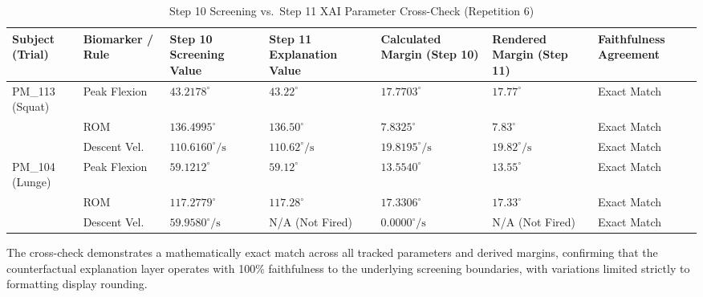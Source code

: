 \begin{table}[htbp]
\centering
\scriptsize
\setlength{\tabcolsep}{3pt}
\renewcommand{\arraystretch}{1.2}
\caption{Step 10 Screening vs.\ Step 11 XAI Parameter Cross-Check (Repetition 6)}
\label{tab:xai-parameter-cross-check}
\begin{tabular}{@{}p{2.1cm} p{2.1cm} >{\centering\arraybackslash}p{2.0cm} >{\centering\arraybackslash}p{2.0cm} >{\centering\arraybackslash}p{2.0cm} >{\centering\arraybackslash}p{2.0cm} >{\centering\arraybackslash}p{2.1cm}@{}}
\hline
\textbf{Subject (Trial)} & \textbf{Biomarker / Rule} & \textbf{Step 10 Screening Value} & \textbf{Step 11 Explanation Value} & \textbf{Calculated Margin (Step 10)} & \textbf{Rendered Margin (Step 11)} & \textbf{Faithfulness Agreement} \\
\hline
PM\_113 (Squat) & Peak Flexion & $43.2178^\circ$ & $43.22^\circ$ & $17.7703^\circ$ & $17.77^\circ$ & Exact Match \\
 & ROM & $136.4995^\circ$ & $136.50^\circ$ & $7.8325^\circ$ & $7.83^\circ$ & Exact Match \\
 & Descent Vel. & $110.6160^\circ/\text{s}$ & $110.62^\circ/\text{s}$ & $19.8195^\circ/\text{s}$ & $19.82^\circ/\text{s}$ & Exact Match \\
PM\_104 (Lunge) & Peak Flexion & $59.1212^\circ$ & $59.12^\circ$ & $13.5540^\circ$ & $13.55^\circ$ & Exact Match \\
 & ROM & $117.2779^\circ$ & $117.28^\circ$ & $17.3306^\circ$ & $17.33^\circ$ & Exact Match \\
 & Descent Vel. & $59.9580^\circ/\text{s}$ & N/A (Not Fired) & $0.0000^\circ/\text{s}$ & N/A (Not Fired) & Exact Match \\
\hline
\end{tabular}
\end{table}

The cross-check demonstrates a mathematically exact match across all tracked parameters and derived margins, confirming that the counterfactual explanation layer operates with 100\% faithfulness to the underlying screening boundaries, with variations limited strictly to formatting display rounding.